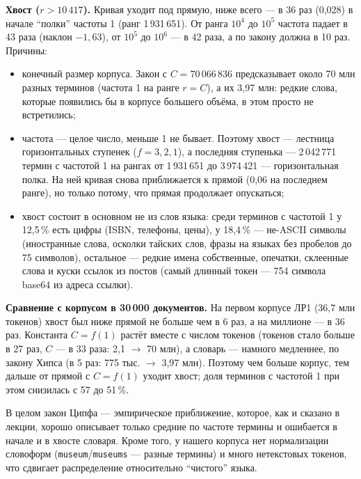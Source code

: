 \textbf{Хвост ($r > 10\,417$).} Кривая уходит под прямую, ниже всего --- в 36 раз (0,028) в начале \enquote{полки} частоты 1 (ранг 1\,931\,651). От ранга $10^4$ до $10^5$ частота падает в 43 раза (наклон $-1{,}63$), от $10^5$ до $10^6$ --- в 42 раза, а по закону должна в 10 раз. Причины:
\begin{itemize}
    \item конечный размер корпуса. Закон с $C = 70\,066\,836$ предсказывает около 70 млн разных терминов (частота 1 на ранге $r = C$), а их 3,97 млн: редкие слова, которые появились бы в корпусе большего объёма, в этом просто не встретились;
    \item частота --- целое число, меньше 1 не бывает. Поэтому хвост --- лестница горизонтальных ступенек ($f = 3, 2, 1$), а последняя ступенька --- 2\,042\,771 термин с частотой 1 на рангах от 1\,931\,651 до 3\,974\,421 --- горизонтальная полка. На ней кривая снова приближается к прямой (0,06 на последнем ранге), но только потому, что прямая продолжает опускаться;
    \item хвост состоит в основном не из слов языка: среди терминов с частотой 1 у 12,5\,\% есть цифры (ISBN, телефоны, цены), у 18,4\,\% --- не-ASCII символы (иностранные слова, осколки тайских слов, фразы на языках без пробелов до 75 символов), остальное --- редкие имена собственные, опечатки, склеенные слова и куски ссылок из постов (самый длинный токен --- 754 символа base64 из адреса ссылки).
\end{itemize}

\textbf{Сравнение с корпусом в 30\,000 документов.} На первом корпусе ЛР1 (36,7 млн токенов) хвост был ниже прямой не больше чем в 6 раз, а на миллионе --- в 36 раз. Константа $C = f(1)$ растёт вместе с числом токенов (токенов стало больше в 27 раз, $C$ --- в 33 раза: 2,1 $\to$ 70 млн), а словарь --- намного медленнее, по закону Хипса (в 5 раз: 775 тыс. $\to$ 3,97 млн). Поэтому чем больше корпус, тем дальше от прямой с $C = f(1)$ уходит хвост; доля терминов с частотой 1 при этом снизилась с 57 до 51\,\%.

В целом закон Ципфа --- эмпирическое приближение, которое, как и сказано в лекции, хорошо описывает только средние по частоте термины и ошибается в начале и в хвосте словаря. Кроме того, у нашего корпуса нет нормализации словоформ (\texttt{museum}/\texttt{museums} --- разные термины) и много нетекстовых токенов, что сдвигает распределение относительно \enquote{чистого} языка.

